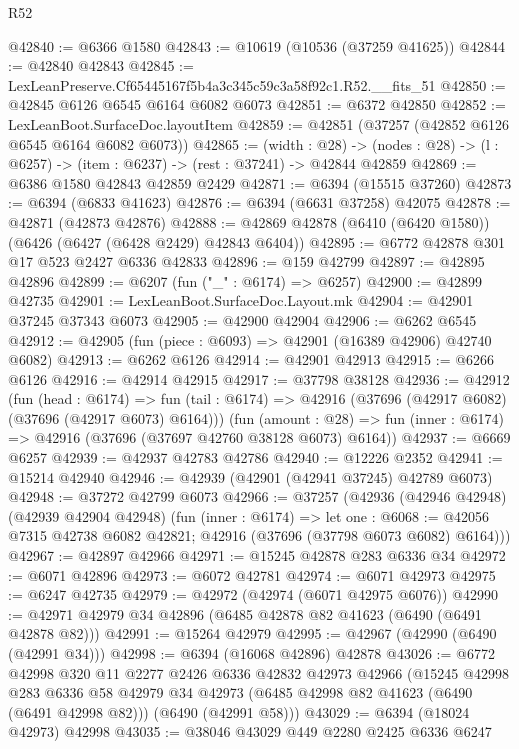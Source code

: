 \begin{lexlean}{R52}
\begin{coremodule}
@42840 := @6366 @1580
@42843 := @10619 (@10536 (@37259 @41625))
@42844 := @42840 @42843
@42845 := LexLeanPreserve.Cf65445167f5b4a3c345c59c3a58f92c1.R52.__fits_51
@42850 := @42845 @6126 @6545 @6164 @6082 @6073
@42851 := @6372 @42850
@42852 := LexLeanBoot.SurfaceDoc.layoutItem
@42859 := @42851 (@37257 (@42852 @6126 @6545 @6164 @6082 @6073))
@42865 := (width : @28) ->
  (nodes : @28) -> (l : @6257) -> (item : @6237) -> (rest : @37241) -> @42844 @42859
@42869 := @6386 @1580 @42843 @42859 @2429
@42871 := @6394 (@15515 @37260)
@42873 := @6394 (@6833 @41623)
@42876 := @6394 (@6631 @37258) @42075
@42878 := @42871 (@42873 @42876)
@42888 := @42869 @42878 (@6410 (@6420 @1580)) (@6426 (@6427 (@6428 @2429) @42843 @6404))
@42895 := @6772 @42878 @301 @17 @523 @2427 @6336 @42833
@42896 := @159 @42799
@42897 := @42895 @42896
@42899 := @6207 (fun ("_" : @6174) => @6257)
@42900 := @42899 @42735
@42901 := LexLeanBoot.SurfaceDoc.Layout.mk
@42904 := @42901 @37245 @37343 @6073
@42905 := @42900 @42904
@42906 := @6262 @6545
@42912 := @42905 (fun (piece : @6093) => @42901 (@16389 @42906) @42740 @6082)
@42913 := @6262 @6126
@42914 := @42901 @42913
@42915 := @6266 @6126
@42916 := @42914 @42915
@42917 := @37798 @38128
@42936 := @42912
    (fun (head : @6174) =>
    fun (tail : @6174) => @42916 (@37696 (@42917 @6082) (@37696 (@42917 @6073) @6164)))
    (fun (amount : @28) =>
    fun (inner : @6174) => @42916 (@37696 (@37697 @42760 @38128 @6073) @6164))
@42937 := @6669 @6257
@42939 := @42937 @42783 @42786
@42940 := @12226 @2352
@42941 := @15214 @42940
@42946 := @42939 (@42901 (@42941 @37245) @42789 @6073)
@42948 := @37272 @42799 @6073
@42966 := @37257
    (@42936
      (@42946 @42948)
      (@42939 @42904 @42948)
      (fun (inner : @6174) =>
      let one : @6068 := @42056 @7315 @42738 @6082 @42821;
      @42916 (@37696 (@37798 @6073 @6082) @6164)))
@42967 := @42897 @42966
@42971 := @15245 @42878 @283 @6336 @34
@42972 := @6071 @42896
@42973 := @6072 @42781
@42974 := @6071 @42973
@42975 := @6247 @42735
@42979 := @42972 (@42974 (@6071 @42975 @6076))
@42990 := @42971 @42979 @34 @42896 (@6485 @42878 @82 @41623 (@6490 (@6491 @42878 @82)))
@42991 := @15264 @42979
@42995 := @42967 (@42990 (@6490 (@42991 @34)))
@42998 := @6394 (@16068 @42896) @42878
@43026 := @6772
    @42998
    @320
    @11
    @2277
    @2426
    @6336
    @42832
    @42973
    @42966
    (@15245
      @42998
      @283
      @6336
      @58
      @42979
      @34
      @42973
      (@6485 @42998 @82 @41623 (@6490 (@6491 @42998 @82)))
      (@6490 (@42991 @58)))
@43029 := @6394 (@18024 @42973) @42998
@43035 := @38046 @43029 @449 @2280 @2425 @6336 @6247

\end{coremodule}
\end{lexlean}
